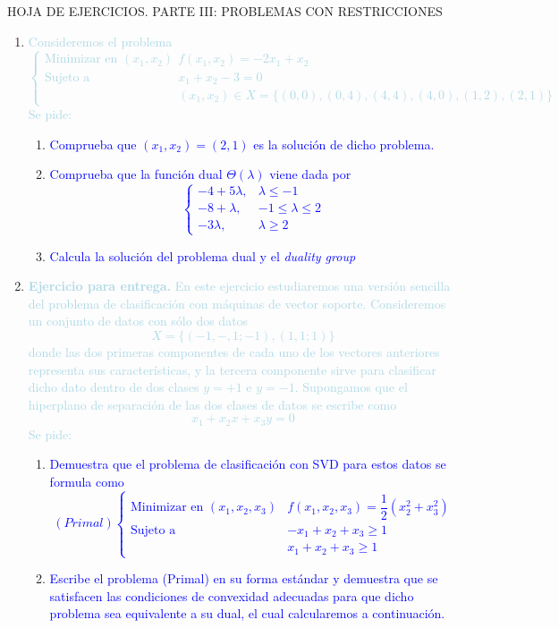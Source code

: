 \documentclass[12pt]{article}
\newcommand{\lb}[1]{\textcolor{lightblue}{#1}}
\newcommand{\db}[1]{\textcolor{blue}{#1}}
\begin{document}
\begin{center}
    HOJA DE EJERCICIOS. PARTE III: PROBLEMAS CON RESTRICCIONES
\end{center}

\begin{enumerate}[label=\color{red}\arabic*.]
    \item \lb{Consideremos el problema \[ \begin{cases}
    \text{Minimizar en }(x_1,x_2) & f(x_1,x_2)=-2x_{1}+x_{2}\\
    \text{Sujeto a} & x_{1}+x_{2}-3=0\\
     & (x_{1},x_{2})\in X=\{(0,0),(0,4),(4,4),(4,0),(1,2),(2,1)\}
    \end{cases} \]Se pide:}
    \begin{enumerate}[label=\color{red}\alph*)]
    	\item \db{Comprueba que $(x_{1},x_{2})=(2,1)$ es la solución de dicho problema.}
    	
    	\item \db{Comprueba que la función dual $\Theta(\lambda)$ viene dada por \[ \begin{cases}
    	-4+5\lambda, & \lambda\le-1\\
    	-8+\lambda, & -1\le\lambda\le 2\\
    	-3\lambda, & \lambda\ge2
    	\end{cases} \]}
    	
    	\item \db{Calcula la solución del problema dual y el \textit{duality group}}
    \end{enumerate}
    \item \lb{\textbf{Ejercicio para entrega.} En este ejercicio estudiaremos una versión sencilla del problema de clasificación con máquinas de vector soporte. Consideremos un conjunto de datos con sólo dos datos \[ X=\{(-1,-,1;-1),(1,1;1)\} \]donde las dos primeras componentes de cada uno de los vectores anteriores representa sus características, y la tercera componente sirve para clasificar dicho dato dentro de dos clases $y=+1$ e $y=-1$. Supongamos que el hiperplano de separación de las dos clases de datos se escribe como \[ x_{1}+x_{2}x+x_{3}y=0 \]Se pide:}
    \begin{enumerate}[label=\color{red}\alph*)]
    	\item \db{Demuestra que el problema de clasificación con SVD para estos datos se formula como \[ (Primal)\begin{cases}
    	\text{Minimizar en }(x_{1},x_{2},x_{3}) & f(x_1,x_2,x_3)=\dfrac{1}{2}(x_2^2+x_3^2)\\
    	\text{Sujeto a } & -x_{1}+x_{2}+x_{3}\ge1 \\
    	 & x_1+x_2+x_3\ge1
    	\end{cases} \]}
    	\item \db{Escribe el problema (Primal) en su forma estándar y demuestra que se satisfacen las condiciones de convexidad adecuadas para que dicho problema sea equivalente a su dual, el cual calcularemos a continuación.}
    	

\end{enumerate}
\end{enumerate}
\end{document}
